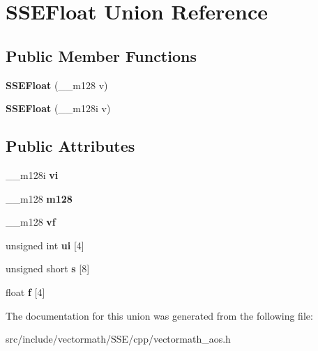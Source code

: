 \hypertarget{unionSSEFloat}{\section{S\-S\-E\-Float Union Reference}
\label{unionSSEFloat}
}
\subsection*{Public Member Functions}
\begin{DoxyCompactItemize}
\item 
\hypertarget{unionSSEFloat_a5338f71202408d7521712695b644fe92}{{\bfseries S\-S\-E\-Float} (\-\_\-\-\_\-m128 v)}\label{unionSSEFloat_a5338f71202408d7521712695b644fe92}

\item 
\hypertarget{unionSSEFloat_a31b48cfb8af4d4b843a0a20535360ee1}{{\bfseries S\-S\-E\-Float} (\-\_\-\-\_\-m128i v)}\label{unionSSEFloat_a31b48cfb8af4d4b843a0a20535360ee1}

\end{DoxyCompactItemize}
\subsection*{Public Attributes}
\begin{DoxyCompactItemize}
\item 
\hypertarget{unionSSEFloat_a6b8f496a26c177ab482ccb8a36c73ddb}{\-\_\-\-\_\-m128i {\bfseries vi}}\label{unionSSEFloat_a6b8f496a26c177ab482ccb8a36c73ddb}

\item 
\hypertarget{unionSSEFloat_a43b3ec91b2407216ad6f50dbb40969b1}{\-\_\-\-\_\-m128 {\bfseries m128}}\label{unionSSEFloat_a43b3ec91b2407216ad6f50dbb40969b1}

\item 
\hypertarget{unionSSEFloat_a8fcfcd25220108144aa83e3161ff71eb}{\-\_\-\-\_\-m128 {\bfseries vf}}\label{unionSSEFloat_a8fcfcd25220108144aa83e3161ff71eb}

\item 
\hypertarget{unionSSEFloat_a2dc78905cd1baf7ef65141e319c09326}{unsigned int {\bfseries ui} \mbox{[}4\mbox{]}}\label{unionSSEFloat_a2dc78905cd1baf7ef65141e319c09326}

\item 
\hypertarget{unionSSEFloat_a30e3c6643eacca62af8d074f5e9bef63}{unsigned short {\bfseries s} \mbox{[}8\mbox{]}}\label{unionSSEFloat_a30e3c6643eacca62af8d074f5e9bef63}

\item 
\hypertarget{unionSSEFloat_aa6095e2b885a2b0d49e880a95865d256}{float {\bfseries f} \mbox{[}4\mbox{]}}\label{unionSSEFloat_aa6095e2b885a2b0d49e880a95865d256}

\end{DoxyCompactItemize}


The documentation for this union was generated from the following file\-:\begin{DoxyCompactItemize}
\item 
src/include/vectormath/\-S\-S\-E/cpp/vectormath\-\_\-aos.\-h\end{DoxyCompactItemize}
